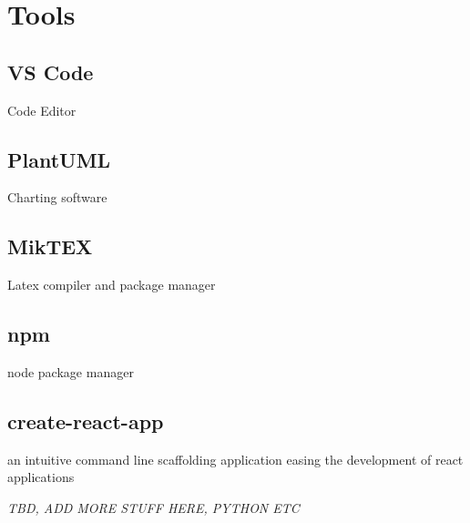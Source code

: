 \section{Tools}
\subsection{VS Code}
Code Editor
\subsection{PlantUML}
Charting software
\subsection{MikTEX}
Latex compiler and package manager
\subsection{npm}
node package manager
\subsection{create-react-app}
an intuitive command line scaffolding application easing the development of react applications

\emph{TBD, ADD MORE STUFF HERE, PYTHON ETC}
